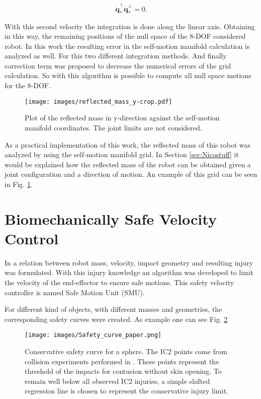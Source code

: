 \begin{equation}
\dot{\mathbf{q}}_*^\top\dot{\mathbf{q}}_*^{\bot}=0.
\label{eq:orthogonalVelocityVectors}
\end{equation}

With this second velocity the integration is done along the linear axis. Obtaining in this way, the remaining positions of the null space of the 8-DOF considered robot.
%
In this work the resulting error in the self-motion manifold calculation is analyzed as well. For this two different integration methods. And finally correction term was proposed to decrease the numerical errors of the grid calculation.  
%
So with this algorithm is possible to compute all null space motions for the 8-DOF. 


\begin{figure}[!htb]
	\centerline{
		\texttt{[image: images/reflected\_mass\_y-crop.pdf]}}
	\caption{Plot of the reflected mass in y-direction against the self-motion 		manifold coordinates. The joint limits are not considered.}
	\label{fig:reflected_mass_y-crop}
\end{figure}

As a practical implementation of this work, the reflected mass of this robot was analyzed by using the self-motion manifold grid. In Section \ref{sec:Nicostuff} it would be explained how the reflected mass of the robot can be obtained given a joint configuration and a direction of motion. 
An example of this grid can be seen in Fig.	\ref{fig:reflected_mass_y-crop}.


 

\section{Biomechanically Safe Velocity Control}
\label{sec:Samistuff}

In \cite{sammi_paper} a relation between robot mass, velocity, impact geometry
and resulting injury was formulated. With this injury knowledge an algorithm was developed to limit the velocity of the end-effector to ensure safe motions. This safety velocity controller is named Safe Motion Unit (SMU). 

For different kind of objects, with different masses and geometries, the corresponding safety curves were created. As example one can see Fig. \ref{fig:Safety_curve_paper}


\begin{figure}[htb]
	\centerline{
		\texttt{[image: images/Safety\_curve\_paper.png]}}
	\caption{Conservative safety curve for a sphere. The IC2 points come from collision experiments performed in \cite{sammi_paper}. These points represent the threshold of the impacts for contusion without skin opening. To remain well below all observed IC2 injuries, a simple shifted regression line is chosen to represent the conservative injury limit.}
	\label{fig:Safety_curve_paper}
\end{figure}
 

